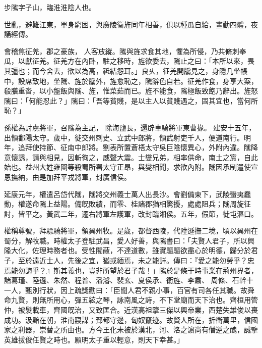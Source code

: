 \begin{pinyinscope}
 
 
 步隲字子山，臨淮淮陰人也。
 
 
 世亂，避難江東，單身窮困，與廣陵衞旌同年相善，俱以種瓜自給，晝勤四體，夜誦經傳。
 
 
會稽焦征羌，郡之豪族，
 人客放縱。隲與旌求食其地，懼為所侵，乃共脩刺奉瓜，以獻征羌。征羌方在內卧，駐之移時，旌欲委去，隲止之曰：「本所以來，畏其彊也；而今舍去，欲以為高，祗結怨耳。」良乆，征羌開牖見之，身隱几坐帳中，設席致地，坐隲、旌於牖外，旌愈恥之，隲辭色自若。征羌作食，身享大案，殽膳重沓，以小盤飯與隲、旌，惟菜茹而已。旌不能食，隲極飯致飽乃辭出。旌怒隲曰：「何能忍此？」隲曰：「吾等貧賤，是以主人以貧賤遇之，固其宜也，當何所恥？」
 
 
孫權為討虜將軍，召隲為主記，
 除海鹽長，還辟車騎將軍東曹掾。
 建安十五年，出領鄱陽太守。歲中，徙交州刺史、立武中郎將，領武射吏千人，便道南行。明年，追拜使持節、征南中郎將。劉表所置蒼梧太守吳巨陰懷異心，外附內違。隲降意懷誘，請與相見，因斬徇之，威聲大震。士燮兄弟，相率供命，南土之賔，自此始也。益州大姓雍闓等殺蜀所署太守正昂，與燮相聞，求欲內附。隲因承制遣使宣恩撫納，由是加拜平戎將軍，封廣信侯。
 
 
 
 
 延康元年，權遣呂岱代隲，隲將交州義士萬人出長沙。會劉備東下，武陵蠻夷蠢動，權遂命隲上益陽。備旣敗績，而零、桂諸郡猶相驚擾，處處阻兵；隲周旋征討，皆平之。黃武二年，遷右將軍左護軍，改封臨湘侯。五年，假節，徙屯漚口。
 
 
權稱尊號，拜驃騎將軍，領兾州牧。是歲，都督西陵，代陸遜撫二境，頃以兾州在蜀分，解牧職。時權太子登駐武昌，愛人好善，與隲書曰：「夫賢人君子，所以興隆大化，佐理時務者也。受性闇蔽，不達道數，雖實驅驅欲盡心於明德，歸分於君子，至於遠近士人，先後之宜，猶或緬焉，未之能詳。傳曰：『愛之能勿勞乎？忠焉能勿誨乎？』斯其義也，豈非所望於君子哉！」隲於是條于時事業在荊州界者，諸葛瑾、陸遜、朱然、程普、潘濬、裴玄、夏侯承、衞旌、李肅、
 周條、石幹十一人，甄別行狀，因上疏獎勸曰：「臣聞人君不親小事，百官有司各任其職。故舜命九賢，則無所用心，彈五絃之琴，詠南風之詩，不下堂廟而天下治也。齊桓用管仲，被髮載車，齊國旣治，又致匡合。近漢高祖擥三傑以興帝業，西楚失雄俊以喪成功。汲黯在朝，淮南寢謀；郅都守邊，匈奴竄迹。故賢人所在，折衝萬里，信國家之利器，崇替之所由也。方今王化未被於漢北，河、洛之濵尚有僭逆之醜，誠擥英雄拔俊任賢之時也。願明太子重以輕意，則天下幸甚。」
 

\end{pinyinscope}
